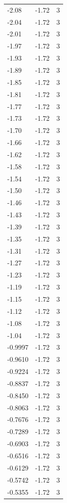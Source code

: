 \begin{longtable}{lrr}
  -2.08 & -1.72 & 3 \\
  -2.04 & -1.72 & 3 \\
  -2.01 & -1.72 & 3 \\
  -1.97 & -1.72 & 3 \\
  -1.93 & -1.72 & 3 \\
  -1.89 & -1.72 & 3 \\
  -1.85 & -1.72 & 3 \\
  -1.81 & -1.72 & 3 \\
  -1.77 & -1.72 & 3 \\
  -1.73 & -1.72 & 3 \\
  -1.70 & -1.72 & 3 \\
  -1.66 & -1.72 & 3 \\
  -1.62 & -1.72 & 3 \\
  -1.58 & -1.72 & 3 \\
  -1.54 & -1.72 & 3 \\
  -1.50 & -1.72 & 3 \\
  -1.46 & -1.72 & 3 \\
  -1.43 & -1.72 & 3 \\
  -1.39 & -1.72 & 3 \\
  -1.35 & -1.72 & 3 \\
  -1.31 & -1.72 & 3 \\
  -1.27 & -1.72 & 3 \\
  -1.23 & -1.72 & 3 \\
  -1.19 & -1.72 & 3 \\
  -1.15 & -1.72 & 3 \\
  -1.12 & -1.72 & 3 \\
  -1.08 & -1.72 & 3 \\
  -1.04 & -1.72 & 3 \\
  -0.9997 & -1.72 & 3 \\
  -0.9610 & -1.72 & 3 \\
  -0.9224 & -1.72 & 3 \\
  -0.8837 & -1.72 & 3 \\
  -0.8450 & -1.72 & 3 \\
  -0.8063 & -1.72 & 3 \\
  -0.7676 & -1.72 & 3 \\
  -0.7289 & -1.72 & 3 \\
  -0.6903 & -1.72 & 3 \\
  -0.6516 & -1.72 & 3 \\
  -0.6129 & -1.72 & 3 \\
  -0.5742 & -1.72 & 3 \\
  -0.5355 & -1.72 & 3 \\

\end{longtable}
